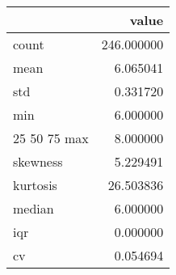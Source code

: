 \begin{tabular}{lr}
\toprule
 & value \\
\midrule
count & 246.000000 \\
mean & 6.065041 \\
std & 0.331720 \\
min & 6.000000 \\
25%
50%
75%
max & 8.000000 \\
skewness & 5.229491 \\
kurtosis & 26.503836 \\
median & 6.000000 \\
iqr & 0.000000 \\
cv & 0.054694 \\
\bottomrule
\end{tabular}
